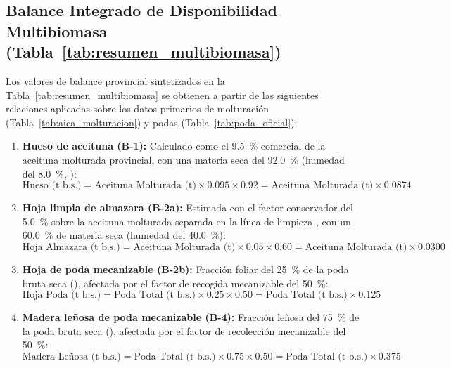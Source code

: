 \documentclass{report}
\begin{document}
\subsection{Balance Integrado de Disponibilidad Multibiomasa (Tabla~\ref{tab:resumen_multibiomasa})}
Los valores de balance provincial sintetizados en la Tabla~\ref{tab:resumen_multibiomasa} se obtienen a partir de las siguientes relaciones aplicadas sobre los datos primarios de molturación (Tabla~\ref{tab:aica_molturacion}) y podas (Tabla~\ref{tab:poda_oficial}):
\begin{enumerate}
    \item \textbf{Hueso de aceituna (B-1):} Calculado como el \SI{9.5}{\percent} comercial de la aceituna molturada provincial, con una materia seca del \SI{92.0}{\percent} (humedad del \SI{8.0}{\percent}, \textcite{RomeroGarcia2022}):
    \begin{equation}
    \text{Hueso (t b.s.)} = \text{Aceituna Molturada (t)} \times 0.095 \times 0.92 = \text{Aceituna Molturada (t)} \times 0.0874
    \label{eq:balance_hueso}
    \end{equation}
    \item \textbf{Hoja limpia de almazara (B-2a):} Estimada con el factor conservador del \SI{5.0}{\percent} sobre la aceituna molturada separada en la línea de limpieza \autocite{RomeroGarcia2014, Manzanares2017}, con un \SI{60.0}{\percent} de materia seca (humedad del \SI{40.0}{\percent}):
    \begin{equation}
    \text{Hoja Almazara (t b.s.)} = \text{Aceituna Molturada (t)} \times 0.05 \times 0.60 = \text{Aceituna Molturada (t)} \times 0.0300
    \label{eq:balance_hoja_alm}
    \end{equation}
    \item \textbf{Hoja de poda mecanizable (B-2b):} Fracción foliar del \SI{25}{\percent} de la poda bruta seca (\textcite{RomeroGarcia2014}), afectada por el factor de recogida mecanizable del \SI{50}{\percent}:
    \begin{equation}
    \text{Hoja Poda (t b.s.)} = \text{Poda Total (t b.s.)} \times 0.25 \times 0.50 = \text{Poda Total (t b.s.)} \times 0.125
    \label{eq:balance_hoja_poda}
    \end{equation}
    \item \textbf{Madera leñosa de poda mecanizable (B-4):} Fracción leñosa del \SI{75}{\percent} de la poda bruta seca (\textcite{RomeroGarcia2014}), afectada por el factor de recolección mecanizable del \SI{50}{\percent}:
    \begin{equation}
    \text{Madera Leñosa (t b.s.)} = \text{Poda Total (t b.s.)} \times 0.75 \times 0.50 = \text{Poda Total (t b.s.)} \times 0.375
    \label{eq:balance_madera_poda}
    \end{equation}
\end{enumerate}
\end{document}

